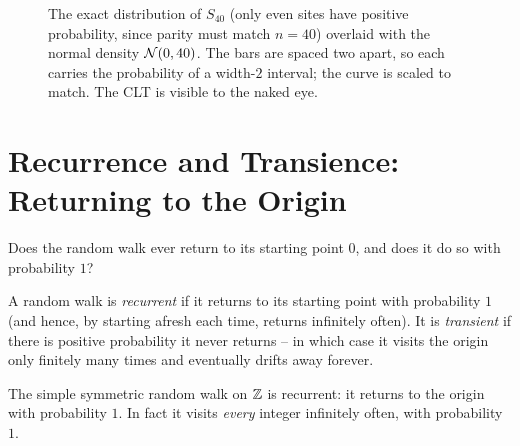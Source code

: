 \begin{figure}[H]
\centering
{}
\caption{The exact distribution of $S_{40}$ (only even sites have positive
probability, since parity must match $n=40$) overlaid with the normal density
$\mathcal{N}(0,40)$. The bars are spaced two apart, so each carries the
probability of a width-$2$ interval; the curve is scaled to match. The CLT is
visible to the naked eye.}
\label{ch26:fig-pmf}
\end{figure}

\section{Recurrence and Transience: Returning to the Origin}
\label{ch26:recurrence}

Does the random walk ever return to its starting point $0$, and does it do so with probability $1$?

\begin{definition}
\label{ch26:def-recurrence}
A random walk is \emph{recurrent} if it returns to its starting point with
probability $1$ (and hence, by starting afresh each time, returns infinitely
often). It is \emph{transient} if there is positive probability it never
returns -- in which case it visits the origin only finitely many times and
eventually drifts away forever.
\end{definition}

\begin{theorem}
\label{ch26:thm-rec1d}
The simple symmetric random walk on $\mathbb{Z}$ is recurrent: it returns to the
origin with probability $1$. In fact it visits \emph{every} integer infinitely
often, with probability $1$.
\end{theorem}

